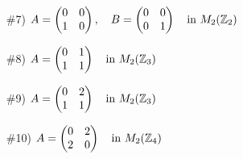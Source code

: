\begin{enumerate}
    \item[\#7)] \( A = \begin{pmatrix} 0 & 0 \\ 1 & 0 \end{pmatrix}, \quad 
                  B = \begin{pmatrix} 0 & 0 \\ 0 & 1 \end{pmatrix} 
                  \quad \text{in } M_2({\mathbb{ Z}}_2) \)
    
    \item[\#8)] \( A = \begin{pmatrix} 0 & 1 \\ 1 & 1 \end{pmatrix} 
                  \quad \text{in } M_2({\mathbb{ Z}}_3) \)
    
    \item[\#9)] \( A = \begin{pmatrix} 0 & 2 \\ 1 & 1 \end{pmatrix} 
                  \quad \text{in } M_2({\mathbb{ Z}}_3) \)
    
    \item[\#10)] \( A = \begin{pmatrix} 0 & 2 \\ 2 & 0 \end{pmatrix} 
                   \quad \text{in } M_2({\mathbb{ Z}}_4) \)
    

\end{enumerate}
